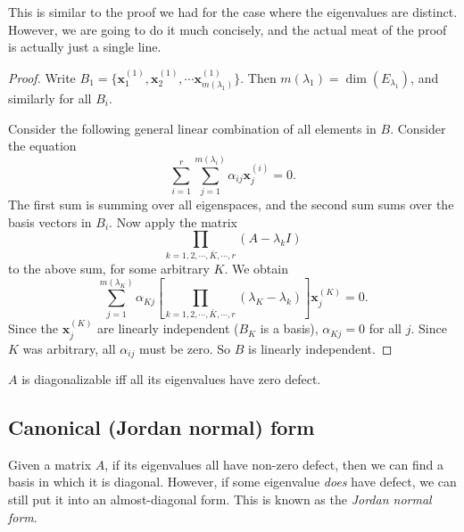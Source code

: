 \documentclass[a4paper]{article}
\begin{document}
This is similar to the proof we had for the case where the eigenvalues are distinct. However, we are going to do it much concisely, and the actual meat of the proof is actually just a single line.
\begin{proof}
  Write $B_1 = \{\mathbf{x}_1^{(1)}, \mathbf{x}_2^{(1)}, \cdots \mathbf{x}_{m(\lambda_1)}^{(1)}\}$. Then $m(\lambda_1) = \dim (E_{\lambda_1})$, and similarly for all $B_i$.

  Consider the following general linear combination of all elements in $B$. Consider the equation
  \[
    \sum_{i = 1}^r\sum_{j = 1}^{m(\lambda_i)} \alpha_{ij} \mathbf{x}_j^{(i)} = 0.
  \]
  The first sum is summing over all eigenspaces, and the second sum sums over the basis vectors in $B_i$. Now apply the matrix
  \[
    \prod_{k = 1, 2, \cdots, \bar{K}, \cdots, r} (A - \lambda_kI)
  \]
  to the above sum, for some arbitrary $K$. We obtain
  \[
    \sum_{j = 1}^{m(\lambda_K)}\alpha_{Kj}\left[\prod_{k = 1, 2, \cdots, \bar{K}, \cdots, r}(\lambda_K - \lambda_k)\right]\mathbf{x}_j^{(K)} = 0.
  \]
  Since the $\mathbf{x}^{(K)}_j$ are linearly independent ($B_K$ is a basis), $\alpha_{Kj} = 0$ for all $j$. Since $K$ was arbitrary, all $\alpha_{ij}$ must be zero. So $B$ is linearly independent.
\end{proof}

\begin{prop}
  $A$ is diagonalizable iff all its eigenvalues have zero defect.
\end{prop}
\subsection{Canonical (Jordan normal) form}
Given a matrix $A$, if its eigenvalues all have non-zero defect, then we can find a basis in which it is diagonal. However, if some eigenvalue \emph{does} have defect, we can still put it into an almost-diagonal form. This is known as the \emph{Jordan normal form}.
\end{document}
